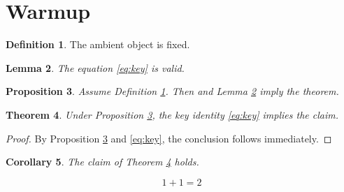 \documentclass{amsart}
\newtheorem{theorem}{Theorem}[section]
\newtheorem{lemma}[theorem]{Lemma}
\newtheorem{proposition}[theorem]{Proposition}
\newtheorem{corollary}[theorem]{Corollary}
\theoremstyle{definition}
\newtheorem{definition}[theorem]{Definition}
\begin{document}
\section{Warmup}
\label{sec:warmup}

\begin{definition}\label{def:base}
The ambient object is fixed.
\end{definition}

\begin{lemma}\label{lem:key}
The equation \eqref{eq:key} is valid.
\end{lemma}

\begin{proposition}\label{prop:key}
Assume Definition \ref{def:base}. Then \cite{Foundations} and Lemma \ref{lem:key} imply the theorem.
\end{proposition}

\begin{theorem}\label{thm:main}
Under Proposition \ref{prop:key}, the key identity \eqref{eq:key} implies the claim.
\end{theorem}

\begin{proof}
By Proposition \ref{prop:key} and \eqref{eq:key}, the conclusion follows immediately.
\end{proof}

\begin{corollary}\label{cor:main}
The claim of Theorem \ref{thm:main} holds.
\end{corollary}

\begin{equation}\label{eq:key}
1 + 1 = 2
\end{equation}
\end{document}
